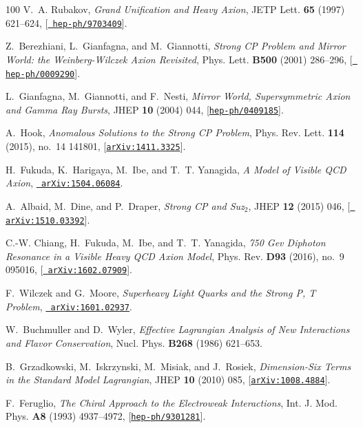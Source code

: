 \documentclass[11pt]{article}
\renewcommand{\[}{\begin{equation}}
\renewcommand{\]}{\end{equation}}
\begin{document}
\begin{thebibliography}{100}
V.~A. Rubakov, {\it {Grand Unification and Heavy Axion}},  JETP Lett. {\bf 65}
  (1997) 621--624, [\href{http://xxx.lanl.gov/abs/hep-ph/9703409}{{\tt
  hep-ph/9703409}}].

Z.~Berezhiani, L.~Gianfagna, and M.~Giannotti, {\it {Strong CP Problem and
  Mirror World: the Weinberg-Wilczek Axion Revisited}},  Phys. Lett. {\bf B500}
  (2001) 286--296, [\href{http://xxx.lanl.gov/abs/hep-ph/0009290}{{\tt
  hep-ph/0009290}}].

L.~Gianfagna, M.~Giannotti, and F.~Nesti, {\it {Mirror World, Supersymmetric
  Axion and Gamma Ray Bursts}},  JHEP {\bf 10} (2004) 044,
  [\href{http://xxx.lanl.gov/abs/hep-ph/0409185}{{\tt hep-ph/0409185}}].

A.~Hook, {\it {Anomalous Solutions to the Strong CP Problem}},  Phys. Rev.
  Lett. {\bf 114} (2015), no.~14 141801,
  [\href{http://xxx.lanl.gov/abs/1411.3325}{{\tt arXiv:1411.3325}}].

H.~Fukuda, K.~Harigaya, M.~Ibe, and T.~T. Yanagida, {\it {A Model of Visible
  QCD Axion}},  \href{http://xxx.lanl.gov/abs/1504.06084}{{\tt
  arXiv:1504.06084}}.

A.~Albaid, M.~Dine, and P.~Draper, {\it {Strong CP and Suz$_{2}$}},  JHEP {\bf
  12} (2015) 046, [\href{http://xxx.lanl.gov/abs/1510.03392}{{\tt
  arXiv:1510.03392}}].

C.-W. Chiang, H.~Fukuda, M.~Ibe, and T.~T. Yanagida, {\it {750 Gev Diphoton
  Resonance in a Visible Heavy QCD Axion Model}},  Phys. Rev. {\bf D93} (2016),
  no.~9 095016, [\href{http://xxx.lanl.gov/abs/1602.07909}{{\tt
  arXiv:1602.07909}}].

F.~Wilczek and G.~Moore, {\it {Superheavy Light Quarks and the Strong P, T
  Problem}},  \href{http://xxx.lanl.gov/abs/1601.02937}{{\tt
  arXiv:1601.02937}}.

W.~Buchmuller and D.~Wyler, {\it {Effective Lagrangian Analysis of New
  Interactions and Flavor Conservation}},  Nucl. Phys. {\bf B268} (1986)
  621--653.

B.~Grzadkowski, M.~Iskrzynski, M.~Misiak, and J.~Rosiek, {\it {Dimension-Six
  Terms in the Standard Model Lagrangian}},  JHEP {\bf 10} (2010) 085,
  [\href{http://xxx.lanl.gov/abs/1008.4884}{{\tt arXiv:1008.4884}}].

F.~Feruglio, {\it {The Chiral Approach to the Electroweak Interactions}},  Int.
  J. Mod. Phys. {\bf A8} (1993) 4937--4972,
  [\href{http://xxx.lanl.gov/abs/hep-ph/9301281}{{\tt hep-ph/9301281}}].


\end{thebibliography}
\end{document}
